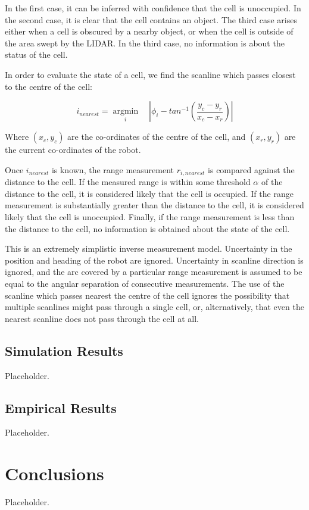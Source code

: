 \documentclass[11pt]{article} %
\begin{document}
In the first case, it can be inferred with confidence that the cell is unoccupied.  
In the second case, it is clear that the cell contains an object.  
The third case arises either when a cell is obscured by a nearby object, or when the cell is outside of the area swept by the LIDAR.  In the third case, no information is about the status of the cell.

In order to evaluate the state of a cell, we find the scanline which passes closest to the centre of the cell:

\begin{equation}
i_{nearest} = \underset{i}{\operatorname{argmin}} \quad | \phi_i - tan^{-1}(\frac{y_c - y_r}{x_c - x_r}) |
\end{equation}

Where $(x_c, y_c)$ are the co-ordinates of the centre of the cell, and $(x_r, y_r)$ are the current co-ordinates of the robot.  

Once $i_{nearest}$ is known, the range measurement $r_{i,nearest}$ is compared against the distance to the cell.  If the measured range is within some threshold $\alpha$ of the distance to the cell, it is considered likely that the cell is occupied.  If the range measurement is substantially greater than the distance to the cell, it is considered likely that the cell is unoccupied.  Finally, if the range measurement is less than the distance to the cell, no information is obtained about the state of the cell.

This is an extremely simplistic inverse measurement model.  Uncertainty in the position and heading of the robot are ignored.  Uncertainty in scanline direction is ignored, and the arc covered by a particular range measurement is assumed to be equal to the angular separation of consecutive measurements.  The use of the scanline which passes nearest the centre of the cell ignores the possibility that multiple scanlines might pass through a single cell, or, alternatively, that even the nearest scanline does not pass through the cell at all.  

\subsection{Simulation Results}

Placeholder.

\subsection{Empirical Results}

Placeholder.

\section{Conclusions}

Placeholder.
\end{document}
